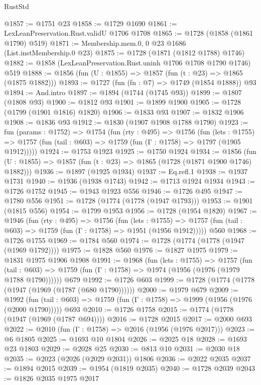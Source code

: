 \begin{lexlean}{RustStd}
\begin{coremodule}
{\begin{coremodule}
{{{{{{{{{{{{{@1857 := @1751 @23
@1858 := @1729 @1690
@1861 := LexLeanPreservation.Rust.validU @1706 @1708
@1865 := @1728 (@1858 (@1861 @1790) @519)
@1871 := Membership.mem.{0, 0} @23 @1686 (List.instMembership.{0} @23)
@1875 := @1728 (@1871 (@1812 @1788) @1746)
@1882 := @1858 (LexLeanPreservation.Rust.uninh @1706 @1708 @1790 @1746) @519
@1888 := @1856 (fun (U : @1855) => @1857 (fun (t : @23) => @1865 (@1875 @1882)))
@1893 := @1727 (fun (fn : @7) => @1749 (@1854 @1888)) @93
@1894 := And.intro
@1897 := @1894 (@1744 (@1745 @93))
@1899 := @1807 (@1808 @93)
@1900 := @1812 @93
@1901 := @1899 @1900
@1905 := @1728 (@1799 (@1901 @1816) @1820)
@1906 := @1833 @93
@1907 := @1832 @1906
@1908 := @1836 @93
@1912 := @1830 (@1907 @1908 @1788 @1790)
@1923 := fun (params : @1752) =>
  @1754
    (fun (rty : @495) =>
    @1756
      (fun (lets : @1755) =>
      @1757 (fun (tail : @603) => @1759 (fun (Γ : @1758) => @1797 (@1905 @1912)))))
@1924 := @1753 @1923
@1925 := @1750 @1924
@1934 := @1856 (fun (U : @1855) => @1857 (fun (t : @23) => @1865 (@1728 (@1871 @1900 @1746) @1882)))
@1936 := @1897 (@1925 @1934)
@1937 := Eq.refl.{1}
@1938 := @1937 @1731
@1940 := @1936 (@1938 @1743)
@1942 := @1713 @1924 @1934
@1943 := @1726 @1752
@1945 := @1943 @1923 @556
@1946 := @1726 @495
@1947 := @1780 @556
@1951 := @1728 (@1774 (@1778 (@1947 @1793)))
@1953 := @1901 (@1815 @556)
@1954 := @1799 @1953
@1956 := @1728 (@1954 @1820)
@1967 := @1946
    (fun (rty : @495) =>
    @1756
      (fun (lets : @1755) =>
      @1757 (fun (tail : @603) => @1759 (fun (Γ : @1758) => @1951 (@1956 @1912)))))
    @560
@1968 := @1726 @1755
@1969 := @1784 @560
@1974 := @1728 (@1774 (@1778 (@1947 (@1969 @1792))))
@1975 := @1828 @560
@1976 := @1827 @1975
@1979 := @1831 @1975 @1906 @1908
@1991 := @1968
    (fun (lets : @1755) =>
    @1757
      (fun (tail : @603) => @1759 (fun (Γ : @1758) => @1974 (@1956 (@1976 (@1979 @1788 @1790))))))
    @679
@1992 := @1726 @603
@1999 := @1728 (@1774 (@1778 (@1947 (@1969 (@1787 (@680 @1790))))))
@2000 := @1979 @679
@2009 := @1992
    (fun (tail : @603) => @1759 (fun (Γ : @1758) => @1999 (@1956 (@1976 (@2000 @1790)))))
    @693
@2010 := @1726 @1758
@2015 := @1774 (@1778 (@1947 (@1969 (@1787 @694))))
@2016 := @1728 @2015
@2017 := @2000 @693
@2022 := @2010 (fun (Γ : @1758) => @2016 (@1956 (@1976 @2017)))
@2023 := @6 @1805
@2025 := @1693 @10 @1804
@2026 := @2025 @18
@2028 := @1693 @23 @1803
@2029 := @2028 @25
@2030 := @813 @10
@2031 := @2030 @18
@2035 := @2023 (@2026 (@2029 @2031)) @1806
@2036 := @2022 @2035
@2037 := @1894 @2015
@2039 := @1954 (@1819 @2035)
@2040 := @1728 @2039
@2043 := @1826 @2035 @1975 @2017
}}}}}}}}}}}}}
\end{coremodule}}
\end{coremodule}
\end{lexlean}
